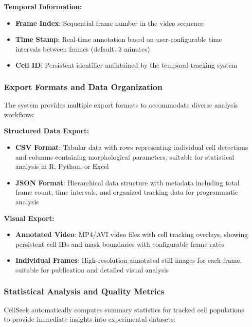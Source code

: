 \documentclass[../cellseek_paper.tex]{subfiles}
\begin{document}
\textbf{Temporal Information:}
\begin{itemize}
  \item \textbf{Frame Index}: Sequential frame number in the video sequence
  \item \textbf{Time Stamp}: Real-time annotation based on user-configurable time intervals between frames (default: 3 minutes)
  \item \textbf{Cell ID}: Persistent identifier maintained by the temporal tracking system
\end{itemize}

\subsubsection{Export Formats and Data Organization}

The system provides multiple export formats to accommodate diverse analysis workflows:

\textbf{Structured Data Export:}
\begin{itemize}
  \item \textbf{CSV Format}: Tabular data with rows representing individual cell detections and columns containing morphological parameters, suitable for statistical analysis in R, Python, or Excel
  \item \textbf{JSON Format}: Hierarchical data structure with metadata including total frame count, time intervals, and organized tracking data for programmatic analysis
\end{itemize}

\textbf{Visual Export:}
\begin{itemize}
  \item \textbf{Annotated Video}: MP4/AVI video files with cell tracking overlays, showing persistent cell IDs and mask boundaries with configurable frame rates
  \item \textbf{Individual Frames}: High-resolution annotated still images for each frame, suitable for publication and detailed visual analysis
\end{itemize}

\subsubsection{Statistical Analysis and Quality Metrics}

CellSeek automatically computes summary statistics for tracked cell populations to provide immediate insights into experimental datasets:
\end{document}

